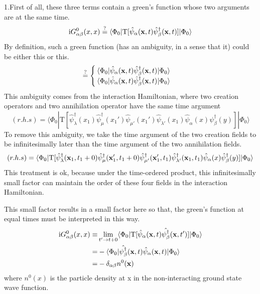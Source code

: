 1.First of all, these three terms contain a green's function whose two arguments are at the same time.
\begin{align}
\mathrm{i}G^0_{\alpha\beta}(x,x)\stackrel{?}{=}\langle\Phi_0|\mathrm{T}[\hat \psi_{\alpha}({\bf x},t)\hat \psi_{\beta}^{\dagger}({\bf x},t)]|\Phi_0\rangle \nonumber
\end{align}
By definition, such a green function (has an ambiguity, in a sense that it) could be either this or this.
\begin{align}
\stackrel{?}{=}
\begin{cases}
\langle\Phi_0|\hat \psi_{\alpha}({\bf x},t)\hat \psi_{\beta}^{\dagger}({\bf x},t)|\Phi_0\rangle  \cr \langle\Phi_0|\hat \psi_{\alpha}({\bf x},t)\hat \psi_{\beta}^{\dagger}({\bf x},t)|\Phi_0\rangle
\end{cases}
\nonumber
\end{align}
This ambiguity comes from the interaction Hamiltonian, where two creation operators and two annihilation operator have the same time argument
$$(r.h.s)=\langle\Phi_0|\mathrm{T}[\hat \psi_{\lambda}^{\dagger}(x_1)\hat \psi_{\mu}^{\dagger}(x_1')\hat \psi_{\mu'}(x_1')\hat \psi_{\lambda'}(x_1)\hat \psi_{\alpha}(x)\psi^{\dagger}_{\beta}(y)]|\Phi_0\rangle $$
To remove this ambiguity, we take the time argument of the two creation fields to be infinitesimally later than the time argument of the two annihilation fields.
$$(r.h.s)=\langle \Phi_0|\mathrm{T}[\hat \psi_{\lambda}^{\dagger}({\bf x}_1,t_1+0)\hat \psi_{\mu}^{\dagger}({\bf x}_1',t_1+0)\hat \psi_{\mu'}^{\dagger}({\bf x}_1',t_1)\hat \psi_{\lambda'}^{\dagger}({\bf x}_1,t_1)\hat \psi_{\alpha}(x)\hat \psi^{\dagger}_{\beta}(y)]|\Phi_0\rangle$$
This treatment is ok, because under the time-ordered product, this infinitesimally small factor can maintain the order of these four fields in the interaction Hamiltonian.

This small factor results in a small factor here so that, the green's function at equal times must be interpreted in this way.
\begin{align}
\mathrm{i}G_{\alpha\beta}^{0}(x,x)\equiv& \lim_{t'\rightarrow t+0} \langle \Phi_0 | \mathrm{T}[\hat\psi_{\alpha}({\bf x},t)\hat{\psi_{\beta}^{\dagger}}({\bf x},t')]|\Phi_0\rangle \nonumber \\
=&-\langle \Phi_0 |\hat{\psi_{\beta}^{\dagger}}({\bf x},t)\hat\psi_{\alpha}({\bf x},t)|\Phi_0\rangle \nonumber \\
=&-\delta_{\alpha\beta}n^0({\bf x}) \nonumber
\end{align}
where $n^0(x) $ is the particle density at x in the non-interacting ground state wave function.

